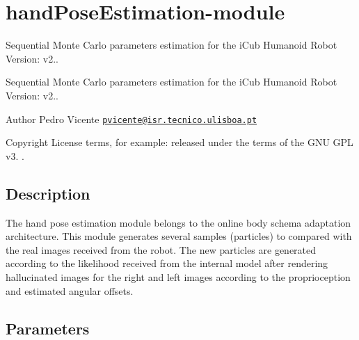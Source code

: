 \section{hand\+Pose\+Estimation-\/module}
\label{group__handPoseEstimation-module}


Sequential Monte Carlo parameters estimation for the i\+Cub Humanoid Robot Version\+: v2..  


Sequential Monte Carlo parameters estimation for the i\+Cub Humanoid Robot Version\+: v2.. 

\begin{DoxyAuthor}{Author}
Pedro Vicente \href{mailto:pvicente@isr.tecnico.ulisboa.pt}{\tt pvicente@isr.\+tecnico.\+ulisboa.\+pt} ~\newline
 
\end{DoxyAuthor}
\begin{DoxyCopyright}{Copyright}
License terms, for example\+: released under the terms of the G\+NU G\+PL v3. . 
\end{DoxyCopyright}
\hypertarget{group__handPoseEstimation-module_intro_sec}{}\subsection{Description}\label{group__handPoseEstimation-module_intro_sec}
The hand pose estimation module belongs to the online body schema adaptation architecture. This module generates several samples (particles) to compared with the real images received from the robot. The new particles are generated according to the likelihood received from the internal model after rendering hallucinated images for the right and left images according to the proprioception and estimated angular offsets.\hypertarget{group__handPoseEstimation-module_parameters_sec}{}\subsection{Parameters}\label{group__handPoseEstimation-module_parameters_sec}

